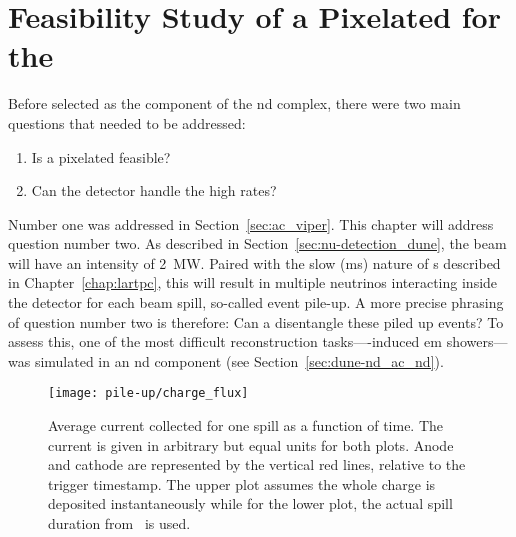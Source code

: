\section{Feasibility Study of a Pixelated  for the  }
\label{sec:dune-nd_pile-up}

Before \AC{} selected as  the \lar{} component of the \dune{} \gls{nd} complex, there were two main questions that needed to be addressed:
\begin{enumerate}
	\item Is a pixelated \lartpc{} feasible?
	\item Can the \lar{} detector handle the high rates?
\end{enumerate}
Number one was addressed in Section~\ref{sec:ac_viper}.
This chapter will address question number two.
As described in Section~\ref{sec:nu-detection_dune}, the \dune{} beam will have an intensity of \SI{2}{\mega\watt}.
Paired with the slow (\si{\milli\second}) nature of \lartpc{}s described in Chapter~\ref{chap:lartpc}, this will result in multiple neutrinos interacting inside the detector for each beam spill, so-called event pile-up.
A more precise phrasing of question number two is therefore: Can a \lartpc{} disentangle these piled up events?
To assess this, one of the most difficult reconstruction tasks---\Pgpz-induced \gls{em} showers---was simulated in an \AC{} \gls{nd} component (see Section~\ref{sec:dune-nd_ac_nd}).

\begin{figure}[htb]
	\centering
	\texttt{[image: pile-up/charge\_flux]}
	\caption[Average current collected for one spill as a function of time]{%
		Average current collected for one spill as a function of time.
		The current is given in arbitrary but equal units for both plots.
		Anode and cathode are represented by the vertical red lines, relative to the trigger timestamp.
		The upper plot assumes the whole charge is deposited instantaneously while for the lower plot, the actual spill duration from~\cite{dune2} is used.
	}
	\label{fig:dune-nd_charge-flux}
\end{figure}

